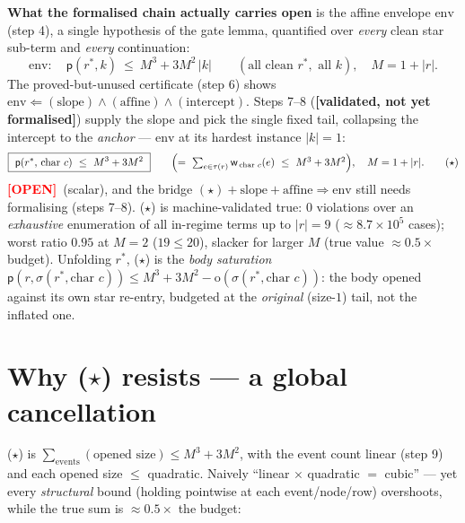 \documentclass[11pt]{article}
\newcommand{\rs}[1]{\lvert #1\rvert}                 %
\newcommand{\sig}{\sigma}                            %
\newcommand{\opn}{\mathrm{o}}                        %
\newcommand{\pot}{\mathsf{p}}                        %
\newcommand{\tr}{\tau}                               %
\newcommand{\wt}{\mathsf{w}}                          %
\newcommand{\VALID}{\textcolor{orange!85!black}{\textbf{[validated, not yet formalised]}}}
\newcommand{\OPEN}{\textcolor{red}{\textbf{[OPEN]}}}
\theoremstyle{definition}
\begin{document}
\textbf{What the formalised chain actually carries open} is the affine envelope $\mathrm{env}$ (step 4), a single hypothesis
of the gate lemma, quantified over \emph{every} clean star sub-term and \emph{every} continuation:
\[
\mathrm{env}:\quad \pot(r^{*},k)\ \le\ M^3+3M^2\,\rs k\qquad(\text{all clean }r^{*},\text{ all }k),\quad M=1+\rs r.
\]
The proved-but-unused certificate (step 6) shows $\mathrm{env}\Leftarrow(\text{slope})\wedge(\text{affine})\wedge(\text{intercept})$.
Steps 7--8 (\VALID) supply the slope and pick the single fixed tail, collapsing the intercept to the \emph{anchor} ---
$\mathrm{env}$ at its hardest instance $\rs k=1$:
\[
\boxed{\ \pot(r^{*},\,\text{char }c)\ \le\ M^3+3M^2\ }
\qquad\Bigl(=\ \textstyle\sum_{e\in\tr(r)}\wt_{\,\text{char }c}(e)\ \le\ M^3+3M^2\Bigr),\quad M=1+\rs r.
\tag{$\star$}
\]
\OPEN\ (scalar), and the bridge $(\star)+\text{slope}+\text{affine}\Rightarrow\mathrm{env}$ still needs formalising (steps 7--8).
($\star$) is machine-validated true: $0$ violations over an \emph{exhaustive} enumeration of all in-regime terms up to
$\rs r=9$ ($\approx8.7\times10^5$ cases); worst ratio $0.95$ at $M=2$ ($19\le20$), slacker for larger $M$ (true value
${\approx}0.5\times$ budget). Unfolding $r^{*}$, ($\star$) is the \emph{body saturation}
$\pot(r,\sig(r^{*},\text{char }c))\le M^3+3M^2-\opn(\sig(r^{*},\text{char }c))$: the body opened against its own star
re-entry, budgeted at the \emph{original} (size-$1$) tail, not the inflated one.

\section{Why ($\star$) resists --- a global cancellation}\label{sec:why}

($\star$) is $\sum_{\text{events}}(\text{opened size})\le M^3+3M^2$, with the event count linear (step 9) and each opened
size $\le$ quadratic. Naively ``linear $\times$ quadratic $=$ cubic'' --- yet every \emph{structural} bound (holding
pointwise at each event/node/row) overshoots, while the true sum is ${\approx}0.5\times$ the budget:
\end{document}
